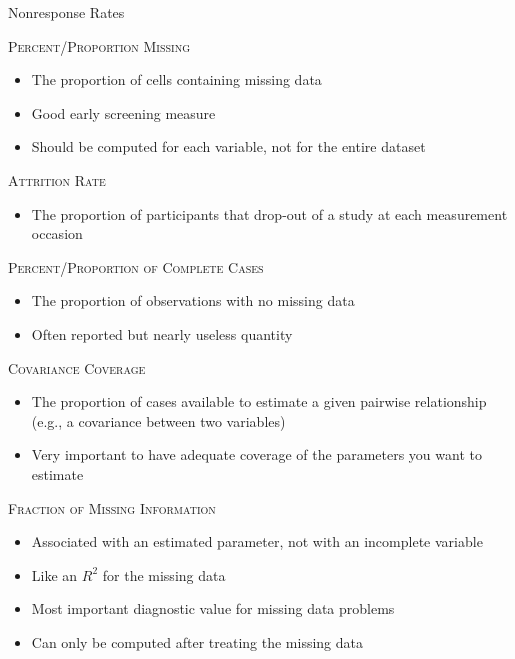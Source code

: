 \documentclass{beamer}\usepackage[]{graphicx}\usepackage[]{color}
\begin{document}
\begin{frame}[allowframebreaks]{Nonresponse Rates}
  
  \textsc{Percent/Proportion Missing}
  \begin{itemize}
  \item The proportion of cells containing missing data
  \item Good early screening measure
  \item Should be computed for each variable, not for the entire dataset
  \end{itemize}
  
  \va
  
  \textsc{Attrition Rate}
  \begin{itemize}
  \item The proportion of participants that drop-out of a study at each 
    measurement occasion
  \end{itemize}
  
  \va
  
  \textsc{Percent/Proportion of Complete Cases}
  \begin{itemize}
  \item The proportion of observations with no missing data
  \item Often reported but nearly useless quantity
  \end{itemize}
  
  \pagebreak
  
  \textsc{Covariance Coverage}
  \begin{itemize}
  \item The proportion of cases available to estimate a given pairwise
    relationship (e.g., a covariance between two variables)
  \item Very important to have adequate coverage of the parameters you
    want to estimate
  \end{itemize}
  
  \va
  
  \textsc{Fraction of Missing Information}
  \begin{itemize}
  \item Associated with an estimated parameter, not with an incomplete variable
  \item Like an $R^2$ for the missing data
  \item Most important diagnostic value for missing data problems
  \item Can only be computed after treating the missing data
  \end{itemize}
  
\end{frame}
\end{document}
